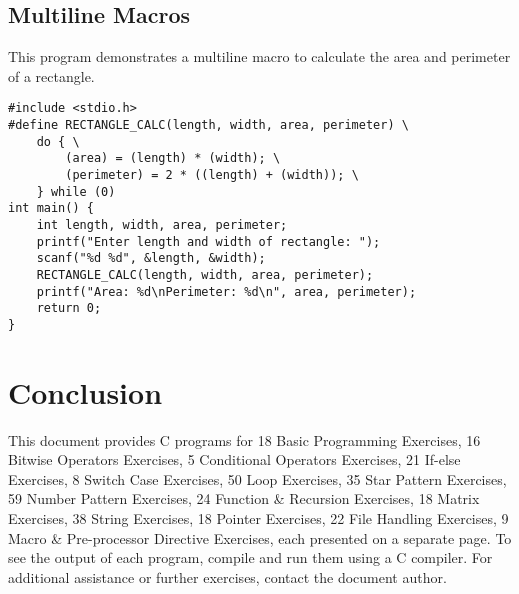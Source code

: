 \documentclass[a4paper,12pt]{article}
\begin{document}
\subsection{Multiline Macros}
This program demonstrates a multiline macro to calculate the area and perimeter of a rectangle.
\begin{lstlisting}[caption={Multiline Macros}]
#include <stdio.h>
#define RECTANGLE_CALC(length, width, area, perimeter) \
    do { \
        (area) = (length) * (width); \
        (perimeter) = 2 * ((length) + (width)); \
    } while (0)
int main() {
    int length, width, area, perimeter;
    printf("Enter length and width of rectangle: ");
    scanf("%d %d", &length, &width);
    RECTANGLE_CALC(length, width, area, perimeter);
    printf("Area: %d\nPerimeter: %d\n", area, perimeter);
    return 0;
}
\end{lstlisting}
\clearpage

\section{Conclusion}
This document provides C programs for 18 Basic Programming Exercises, 16 Bitwise Operators Exercises, 5 Conditional Operators Exercises, 21 If-else Exercises, 8 Switch Case Exercises, 50 Loop Exercises, 35 Star Pattern Exercises, 59 Number Pattern Exercises, 24 Function & Recursion Exercises, 18 Matrix Exercises, 38 String Exercises, 18 Pointer Exercises, 22 File Handling Exercises, 9 Macro & Pre-processor Directive Exercises, each presented on a separate page. To see the output of each program, compile and run them using a C compiler. For additional assistance or further exercises, contact the document author.
\end{document}

